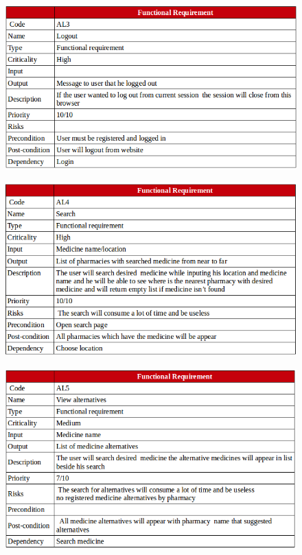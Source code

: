 \documentclass[]{article}
\begin{document}
\begin{figure}[H]
\centering
\includegraphics[scale=0.4]{./f/03}
\end{figure}

\begin{figure}[H]
\centering
\includegraphics[scale=0.4]{./f/04}
\end{figure}

\begin{figure}[H]
\centering
\includegraphics[scale=0.4]{./f/05}
\end{figure}
\end{document}
